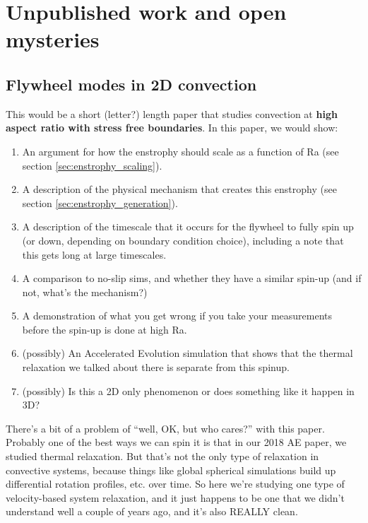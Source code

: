 \chapter{Unpublished work and open mysteries}
\label{ch:unpublished}

\section{Flywheel modes in 2D convection}
\label{sec:flywheels}
This would be a short (letter?) length paper that studies \RB convection at \textbf{high aspect ratio with stress free boundaries}.
In this paper, we would show:
\begin{enumerate}
\item An argument for how the enstrophy should scale as a function of Ra (see section \ref{sec:enstrophy_scaling}).
\item A description of the physical mechanism that creates this enstrophy (see section \ref{sec:enstrophy_generation}).
\item A description of the timescale that it occurs for the flywheel to fully spin up (or down, depending on boundary condition choice), including a note that this gets long at large timescales.
\item A comparison to no-slip sims, and whether they have a similar spin-up (and if not, what's the mechanism?)
\item A demonstration of what you get wrong if you take your measurements before the spin-up is done at high Ra.
\item (possibly) An Accelerated Evolution simulation that shows that the thermal relaxation we talked about there is separate from this spinup.
\item (possibly) Is this a 2D only phenomenon or does something like it happen in 3D?
\end{enumerate}

There's a bit of a problem of ``well, OK, but who cares?'' with this paper.
Probably one of the best ways we can spin it is that in our 2018 AE paper, we studied thermal relaxation.
But that's not the only type of relaxation in convective systems, because things like global spherical simulations build up differential rotation profiles, etc. over time.
So here we're studying one type of velocity-based system relaxation, and it just happens to be one that we didn't understand well a couple of years ago, and it's also REALLY clean.

